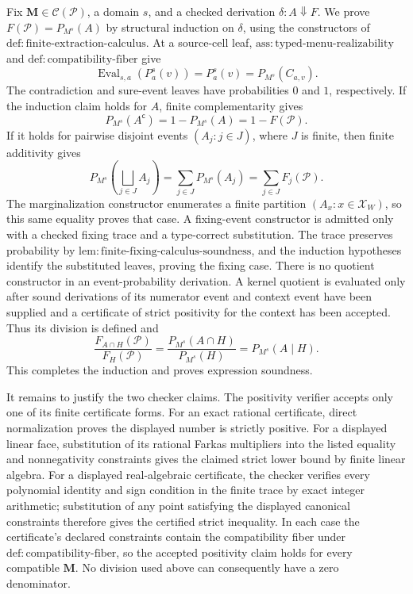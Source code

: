 Fix \(\mathbf M\in\mathcal C(\mathcal P)\), a domain \(s\), and a checked derivation \(\delta:A\Downarrow F\).  We prove \(F(\mathcal P)=P_{M^s}(A)\) by structural induction on \(\delta\), using the constructors of \(\mathrm{def:finite\text{-}extraction\text{-}calculus}\).  At a source-cell leaf, \(\mathrm{ass:typed\text{-}menu\text{-}realizability}\) and \(\mathrm{def:compatibility\text{-}fiber}\) give
\[
 \operatorname{Eval}_{s,a}\!\left(P_a^s(v)\right)
 =P_a^s(v)
 =P_{M^s}(C_{a,v}).
\]
The contradiction and sure-event leaves have probabilities \(0\) and \(1\), respectively.  If the induction claim holds for \(A\), finite complementarity gives
\[
 P_{M^s}(A^{\mathsf c})
 =1-P_{M^s}(A)
 =1-F(\mathcal P).
\]
If it holds for pairwise disjoint events \((A_j:j\in J)\), where \(J\) is finite, then finite additivity gives
\[
 P_{M^s}\!\left(\bigsqcup_{j\in J}A_j\right)
 =\sum_{j\in J}P_{M^s}(A_j)
 =\sum_{j\in J}F_j(\mathcal P).
\]
The marginalization constructor enumerates a finite partition \((A_x:x\in\mathcal X_W)\), so this same equality proves that case.  A fixing-event constructor is admitted only with a checked fixing trace and a type-correct substitution.  The trace preserves probability by \(\mathrm{lem:finite\text{-}fixing\text{-}calculus\text{-}soundness}\), and the induction hypotheses identify the substituted leaves, proving the fixing case.  There is no quotient constructor in an event-probability derivation.  A kernel quotient is evaluated only after sound derivations of its numerator event and context event have been supplied and a certificate of strict positivity for the context has been accepted.  Thus its division is defined and
\[
 \frac{F_{A\cap H}(\mathcal P)}{F_H(\mathcal P)}
 =\frac{P_{M^s}(A\cap H)}{P_{M^s}(H)}
 =P_{M^s}(A\mid H).
\]
This completes the induction and proves expression soundness.

It remains to justify the two checker claims.  The positivity verifier accepts only one of its finite certificate forms.  For an exact rational certificate, direct normalization proves the displayed number is strictly positive.  For a displayed linear face, substitution of its rational Farkas multipliers into the listed equality and nonnegativity constraints gives the claimed strict lower bound by finite linear algebra.  For a displayed real-algebraic certificate, the checker verifies every polynomial identity and sign condition in the finite trace by exact integer arithmetic; substitution of any point satisfying the displayed canonical constraints therefore gives the certified strict inequality.  In each case the certificate's declared constraints contain the compatibility fiber under \(\mathrm{def:compatibility\text{-}fiber}\), so the accepted positivity claim holds for every compatible \(\mathbf M\).  No division used above can consequently have a zero denominator.

